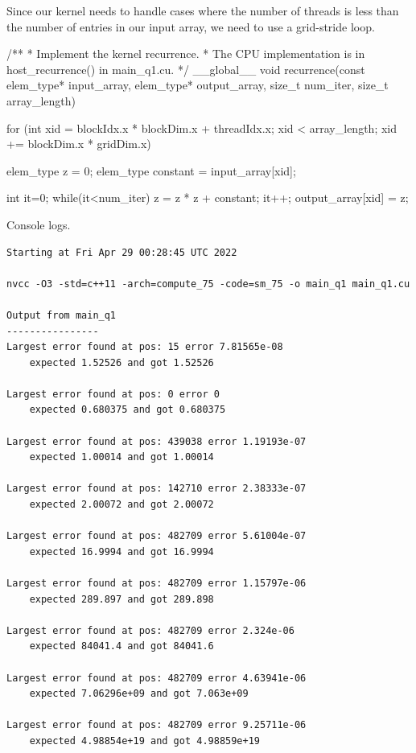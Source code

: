 \documentclass[12pt,letterpaper,twoside]{article}
\begin{document}
\begin{itemize}
    Since our kernel needs to handle cases where the number of threads is less 
    than the number of entries in our input array, we need to use a grid-stride 
    loop.

\begin{cpp}
/**
* Implement the kernel recurrence.
* The CPU implementation is in host_recurrence() in main_q1.cu.
*/
__global__ void recurrence(const elem_type* input_array,
                            elem_type* output_array, 
                            size_t num_iter,
                            size_t array_length) {

    for (int xid = blockIdx.x * blockDim.x + threadIdx.x;
        xid < array_length;
        xid += blockDim.x * gridDim.x) {
    
        elem_type z = 0;
        elem_type constant = input_array[xid];

        int it=0;
        while(it<num_iter) {
        z = z * z + constant;
        it++;
        }
        output_array[xid] = z;
    }
}
\end{cpp}
    
    Console logs.
\begin{verbatim}
Starting at Fri Apr 29 00:28:45 UTC 2022

nvcc -O3 -std=c++11 -arch=compute_75 -code=sm_75 -o main_q1 main_q1.cu

Output from main_q1
----------------
Largest error found at pos: 15 error 7.81565e-08 
    expected 1.52526 and got 1.52526

Largest error found at pos: 0 error 0 
    expected 0.680375 and got 0.680375

Largest error found at pos: 439038 error 1.19193e-07 
    expected 1.00014 and got 1.00014

Largest error found at pos: 142710 error 2.38333e-07 
    expected 2.00072 and got 2.00072

Largest error found at pos: 482709 error 5.61004e-07 
    expected 16.9994 and got 16.9994

Largest error found at pos: 482709 error 1.15797e-06 
    expected 289.897 and got 289.898

Largest error found at pos: 482709 error 2.324e-06 
    expected 84041.4 and got 84041.6

Largest error found at pos: 482709 error 4.63941e-06 
    expected 7.06296e+09 and got 7.063e+09

Largest error found at pos: 482709 error 9.25711e-06 
    expected 4.98854e+19 and got 4.98859e+19


\end{verbatim}
\end{itemize}
\end{document}

